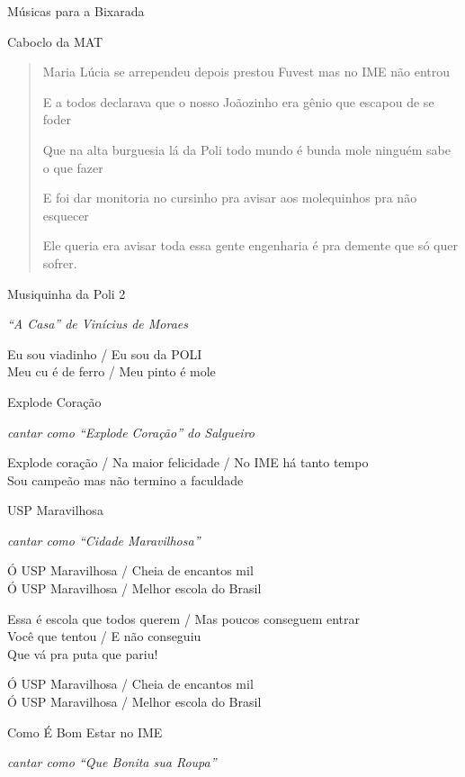 \begin{secao}{Músicas para a Bixarada}
\begin{subsecao}{Caboclo da MAT}
\begin{verse}
Maria Lúcia se arrependeu depois prestou Fuvest mas no IME não entrou

E a todos declarava que o nosso Joãozinho era gênio que escapou de se foder

Que na alta burguesia lá da Poli todo mundo é bunda mole ninguém sabe o que
fazer

E foi dar monitoria no cursinho pra avisar aos molequinhos pra não esquecer

Ele queria era avisar toda essa gente engenharia é pra demente que só quer
sofrer.
\end{verse}
\end{subsecao}

\begin{subsecao}{Musiquinha da Poli 2}

{\em ``A Casa'' de Vinícius de Moraes}

Eu sou viadinho / Eu sou da POLI \\
Meu cu é de ferro / Meu pinto é mole
\end{subsecao}

\begin{subsecao}{Explode Coração}

{\em cantar como ``Explode Coração'' do Salgueiro}

Explode coração / Na maior felicidade / No IME há tanto tempo \\
Sou campeão mas não termino a faculdade
\end{subsecao}

\begin{subsecao}{USP Maravilhosa}

{\em cantar como ``Cidade Maravilhosa''}

Ó USP Maravilhosa / Cheia de encantos mil \\
Ó USP Maravilhosa / Melhor escola do Brasil

Essa é escola que todos querem / Mas poucos conseguem entrar \\
Você que tentou / E não conseguiu \\
Que vá pra puta que pariu!

Ó USP Maravilhosa / Cheia de encantos mil \\
Ó USP Maravilhosa / Melhor escola do Brasil
\end{subsecao}

\begin{subsecao}{Como É Bom Estar no IME}

{\em cantar como ``Que Bonita sua Roupa''}


\end{subsecao}
\end{secao}
